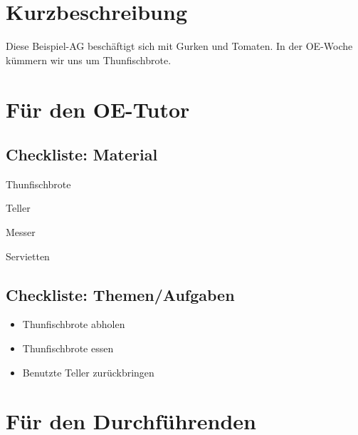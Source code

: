 \documentclass[a4paper,11pt]{scrartcl} %
\newenvironment{myitemize}{\begin{itemize}\itemsep -2pt}{\end{itemize}} %
\begin{document}
\thispagestyle{firststyle}

\begin{wrapfigure}{r}{130pt}
\vspace{-78pt}
  \fbox{
  \begin{minipage}{140pt}
   \tableofcontents
  \end{minipage}
  }
\end{wrapfigure}

\section{Kurzbeschreibung} %
    Diese Beispiel-AG beschäftigt sich mit Gurken und Tomaten. 
    In der OE-Woche kümmern wir uns um Thunfischbrote. 
    
\section{Für den OE-Tutor}
  \subsection{Checkliste: Material} %
    \begin{multicols}{2}[]
      \begin{myitemize}
      \begin{raggedright}
	\item[\Square] Thunfischbrote
	\item[\Square] Teller
	\item[\Square] Messer
	\item[\Square] Servietten
      \end{raggedright}
      \end{myitemize}
    \end{multicols}
  \subsection{Checkliste: Themen/Aufgaben} %
      \begin{myitemize}
	\item[\Square] Thunfischbrote abholen
	\item[\Square] Thunfischbrote essen
	\item[\Square] Benutzte Teller zurückbringen
      \end{myitemize}

\section{Für den Durchführenden}
\end{document}
